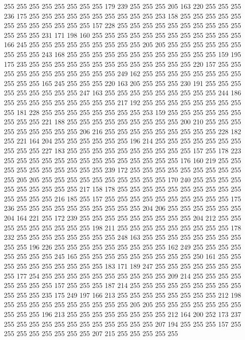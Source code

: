 255 255 255 255 255 255 255 255 179 239 255 255 255 205 163 220 255 255 255 236
175 255 255 255 255 255 255 255 255 255 255 253 158 255 255 255 255 255 255 255
255 255 255 255 255 157 228 255 255 255 255 255 255 255 255 255 255 255 255 255
231 171 198 160 255 255 255 255 255 255 255 255 255 255 255 255 166 245 255 255
255 255 255 255 255 255 255 205 205 255 255 255 255 255 255 255 255 255 243 168
255 255 255 255 255 255 255 255 255 255 255 255 159 195 175 235 255 255 255 255
255 255 255 255 255 255 255 255 255 220 157 255 255 255 255 255 255 255 255 255
255 255 249 162 255 255 255 255 255 255 255 255 255 255 255 165 245 255 255 255
220 163 205 255 255 255 230 191 255 255 255 255 255 255 255 255 255 247 163 255
255 255 255 255 255 255 255 255 244 186 255 255 255 255 255 255 255 255 255 217
192 255 255 255 255 255 255 255 255 255 181 228 255 255 255 255 255 255 255 255
253 159 255 255 255 255 255 255 255 255 255 221 188 255 255 255 255 255 255 255
255 255 200 210 255 255 255 255 255 255 255 255 255 206 216 255 255 255 255 255
255 255 255 255 228 182 255 221 164 204 255 255 255 255 255 255 196 214 255 255
255 255 255 255 255 255 255 255 227 183 255 255 255 255 255 255 255 255 255 255
157 255 178 223 255 255 255 255 255 255 255 255 255 255 255 255 255 255 176 160
219 255 255 255 255 255 255 255 255 255 255 239 172 255 255 255 255 255 255 255
255 255 255 205 205 255 255 255 255 255 255 255 255 255 255 170 240 255 255 255
255 255 255 255 255 255 255 217 158 178 255 255 255 255 255 255 255 255 255 255
255 255 255 255 216 185 255 157 255 255 255 255 255 255 255 255 255 255 175 236
255 255 255 255 255 255 255 255 255 255 204 206 255 255 255 255 255 255 204 164
221 255 172 239 255 255 255 255 255 255 255 255 255 204 212 255 255 255 255 255
255 255 255 255 198 211 255 255 255 255 255 255 255 255 255 178 232 255 255 255
255 255 255 255 255 248 163 255 255 255 255 255 255 255 255 255 255 196 226 255
255 255 255 255 255 255 255 255 162 249 255 255 255 255 255 255 255 255 245 165
255 255 255 255 255 255 255 255 255 250 161 255 255 255 255 255 255 255 255 255
255 183 171 189 247 255 255 255 255 255 255 255 255 177 254 255 255 255 255 255
255 255 255 255 255 209 214 255 255 255 255 255 255 255 255 157 255 255 255 187
214 255 255 255 255 255 255 255 255 255 255 255 255 235 175 249 197 166 213 255
255 255 255 255 255 255 255 212 198 255 255 255 255 255 255 255 255 255 255 205
205 255 255 255 255 255 255 255 255 255 255 196 213 255 255 255 255 255 255 255
255 212 164 200 252 173 237 255 255 255 255 255 255 255 255 255 255 255 255 207
194 255 255 255 157 255 255 255 255 255 255 255 255 207 215 255 255 255 255 255
